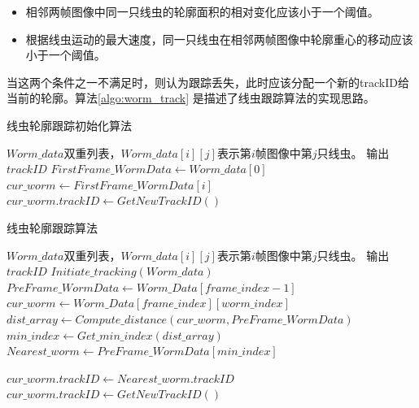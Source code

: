 	\begin{itemize}
	  \item 相邻两帧图像中同一只线虫的轮廓面积的相对变化应该小于一个阈值。
	  \item 根据线虫运动的最大速度，同一只线虫在相邻两帧图像中轮廓重心的移动应该小于一个阈值。
	\end{itemize}
	当这两个条件之一不满足时，则认为跟踪丢失，此时应该分配一个新的trackID给当前的轮廓。算法\ref{algo:worm_track}
	是描述了线虫跟踪算法的实现思路。
\begin{algorithm}
\caption{线虫轮廓跟踪初始化算法}
\label{algo:initial_track}
\begin{algorithmic}[1]
	\Require $Worm\_data$双重列表，$Worm\_data[i][j]$表示第$i$帧图像中第$j$只线虫。
	\Ensure 输出$trackID$
		\State $FirstFrame\_WormData \gets Worm\_data[0]$
			\State $cur\_worm \gets FirstFrame\_WormData[i]$
			\State $cur\_worm.trackID \gets GetNewTrackID()$
		\EndFor
\EndFunction
\end{algorithmic}
\end{algorithm}

\begin{algorithm}[H]
\caption{线虫轮廓跟踪算法}
\label{algo:worm_track}
\begin{algorithmic}[1]
	\Require $Worm\_data$双重列表，$Worm\_data[i][j]$表示第$i$帧图像中第$j$只线虫。
	\Ensure 输出$trackID$
		\State $Initiate\_tracking(Worm\_data)$
			\State $PreFrame\_WormData \gets Worm\_Data[frame\_index-1] $
				\State $cur\_worm \gets Worm\_Data[frame\_index][worm\_index]$
				\State $dist\_array \gets Compute\_distance(cur\_worm,PreFrame\_WormData)$
				\State $min\_index \gets Get\_min\_index(dist\_array)$
				\State $Nearest\_worm \gets PreFrame\_WormData[min\_index]$
\end{algorithmic}
\end{algorithm}
\begin{algorithm}[H]
\begin{algorithmic}[1]
					\State $cur\_worm.trackID \gets Nearest\_worm.trackID$
				\Else
					\State $cur\_worm.trackID \gets GetNewTrackID( )$
				\EndIf
			\EndFor
		\EndFor
\EndFunction
\end{algorithmic}
\end{algorithm}
